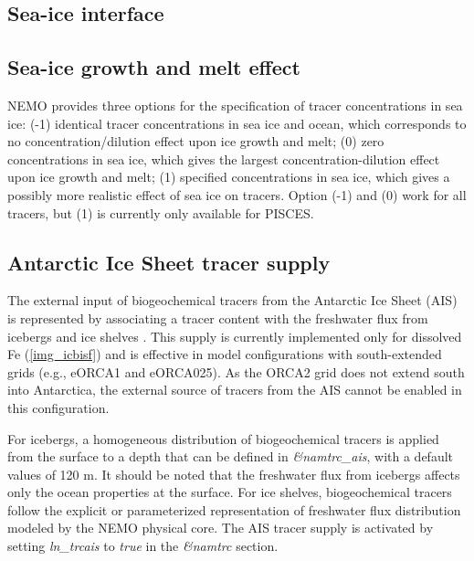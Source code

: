 \documentclass[../main/TOP_manual]{subfiles}
\begin{document}

\subsection{Sea-ice interface}

\subsection*{Sea-ice growth and melt effect}

NEMO provides three options for the specification of tracer concentrations in sea ice: (-1) identical tracer concentrations in sea ice and ocean, which corresponds to no concentration/dilution effect upon ice growth and melt; (0) zero concentrations in sea ice, which gives the largest concentration-dilution effect upon ice growth and melt; (1) specified concentrations in sea ice, which gives a possibly more realistic effect of sea ice on tracers. Option (-1) and (0) work for all tracers, but (1) is currently only available for PISCES.


\subsection*{Antarctic Ice Sheet tracer supply}

The external input of biogeochemical tracers from the Antarctic Ice Sheet (AIS) is represented by associating a tracer content with the freshwater flux from icebergs and ice shelves \citep{person_sensitivity_2019}. This supply is currently implemented only for dissolved Fe (\autoref{img_icbisf}) and is effective in model configurations with south-extended grids (e.g., eORCA1 and eORCA025). As the ORCA2 grid does not extend south into Antarctica, the external source of tracers from the AIS cannot be enabled in this configuration. 

For icebergs, a homogeneous distribution of biogeochemical tracers is applied from the surface to a depth that can be defined in \textit{\&namtrc\_ais}, with a default values of 120 m. It should be noted that the freshwater flux from icebergs affects only the ocean properties at the surface. For ice shelves, biogeochemical tracers follow the explicit or parameterized representation of freshwater flux distribution modeled by the NEMO physical core. The AIS tracer supply is activated by setting \textit{ln\_trcais} to \textit{true} in the \textit{\&namtrc} section.
\end{document}
